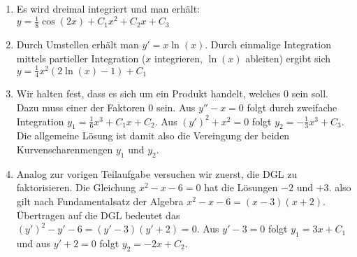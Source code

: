 \item

\begin{enumerate}
	\item Es wird dreimal integriert und man erhält: $y = \frac{1}{8} \cos(2x) + C_1 x^2 + C_2 x + C_3$
	\item Durch Umstellen erhält man $y' = x \ln(x)$. Durch einmalige Integration mittels partieller Integration ($x$ integrieren, $\ln(x)$ ableiten) ergibt sich $y = \frac{1}{4}x^2(2\ln(x) - 1) + C_1$
	\item Wir halten fest, dass es sich um ein Produkt handelt, welches $0$ sein soll. Dazu muss einer der Faktoren $0$ sein. Aus $y''-x=0$ folgt durch zweifache Integration $y_1 = \frac{1}{6}x^3 + C_1 x + C_2$. Aus $(y')^2+x^2=0$ folgt $y_2=-\frac{1}{3}x^3 + C_3$. Die allgemeine Lösung ist damit also die Vereingung der beiden Kurvenscharenmengen $y_1$ und $y_2$.
	\item Analog zur vorigen Teilaufgabe versuchen wir zuerst, die DGL zu faktorisieren. Die Gleichung $x^2-x-6=0$ hat die Lösungen $-2$ und $+3$. also gilt nach Fundamentalsatz der Algebra $x^2-x-6=(x-3)(x+2)$. Übertragen auf die DGL bedeutet das $(y')^2-y'-6 = (y'-3)(y'+2) = 0$. Aus $y'-3=0$ folgt $y_1 = 3x+C_1$ und aus $y'+2=0$ folgt $y_2 = -2x+C_2$.
\end{enumerate}